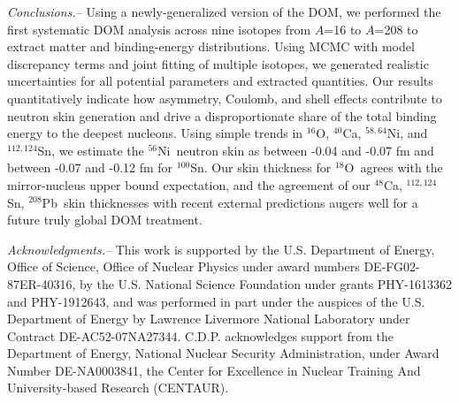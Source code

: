 \documentclass[twocolumn,secnumarabic,amssymb, nobibnotes, aps, prl, superscriptaddress, nobalancelastpage]{revtex4-1}
\newcommand{\oSix}{\ensuremath{^{16}}O}
\newcommand{\oEight}{\ensuremath{^{18}}O}
\newcommand{\caForty}{\ensuremath{^{40}}C\lowercase{a}}
\newcommand{\caEight}{\ensuremath{^{48}}C\lowercase{a}}
\newcommand{\niSix}{\ensuremath{^{56}}N\lowercase{i}}
\newcommand{\niEightFour}{\ensuremath{^{58,64}}N\lowercase{i}}
\newcommand{\snHundred}{\ensuremath{^{100}}S\lowercase{n}}
\newcommand{\snTwelveFour}{\ensuremath{^{112,124}}S\lowercase{n}}
\newcommand{\pbEight}{\ensuremath{^{208}}P\lowercase{b}}
\begin{document}
\textit{Conclusions.--}
Using a newly-generalized version of the DOM, we performed the first
systematic DOM analysis across nine isotopes from $A$=16 to $A$=208
to extract matter and binding-energy distributions. Using MCMC with
model discrepancy terms and joint fitting of multiple
isotopes, we generated realistic uncertainties for all potential parameters and extracted quantities.
Our results quantitatively indicate how asymmetry, Coulomb, and shell effects contribute to
neutron skin generation and drive a disproportionate share of
the total binding energy to the deepest nucleons.
Using simple trends in \oSix, \caForty, \niEightFour, and
\snTwelveFour, we estimate the \niSix\ neutron skin as between -0.04 and -0.07 fm
and between -0.07 and -0.12 fm for \snHundred. Our
skin thickness for \oEight\ agrees with the mirror-nucleus upper bound expectation,
and the agreement of our \caEight, \snTwelveFour, \pbEight\ skin thicknesses with recent external
predictions augers well for a future truly global DOM treatment.

\textit{Acknowledgments.--}
This work is supported by the U.S. Department of Energy, Office of Science, 
Office of Nuclear Physics under award numbers DE-FG02-87ER-40316,
by the U.S. National Science Foundation under grants PHY-1613362 and PHY-1912643,
and was performed in part under the auspices of the U.S. Department of Energy
by Lawrence Livermore National Laboratory under Contract DE-AC52-07NA27344.
C.D.P. acknowledges support from the Department of Energy, National Nuclear Security
Administration, under Award Number DE-NA0003841, the Center for Excellence in
Nuclear Training And University-based Research (CENTAUR).



\end{document}
